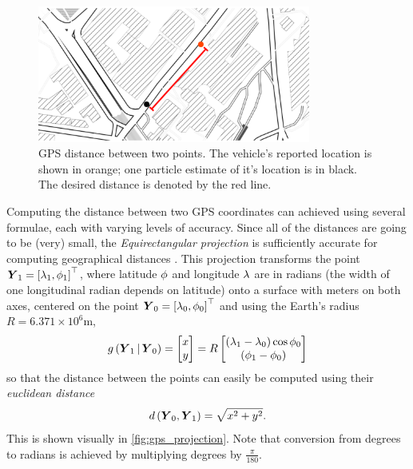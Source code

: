 \begin{knitrout}
\color{fgcolor}\begin{figure}

{\centering \includegraphics[width=0.8\textwidth]{figure/gps_dist-1} 

}

\caption[GPS distance between two points]{GPS distance between two points. The vehicle's reported location is shown in orange; one particle estimate of it's location is in black. The desired distance is denoted by the red line.}\label{fig:gps_dist}
\end{figure}


\end{knitrout}

Computing the distance between two GPS coordinates can achieved using several formulae, each with varying levels of accuracy. Since all of the distances are going to be (very) small, the \emph{Equirectangular projection} is sufficiently accurate for computing geographical distances \citep{cn}. This projection transforms the point $\boldsymbol{Y}_1 = \left[\lambda_1, \phi_1\right]^\top$, where latitude $\phi$ and longitude $\lambda$ are in radians (the width of one longitudinal radian depends on latitude) onto a surface with meters on both axes, centered on the point $\boldsymbol{Y}_0 = \left[\lambda_0, \phi_0\right]^\top$ and using the Earth's radius $R = 6.371 \times 10^6$m,
\begin{equation}
\label{eq:equirectangular_projection}
g\left(\boldsymbol{Y}_1\,|\,\boldsymbol{Y}_0\right) =
\begin{bmatrix} x \\ y \end{bmatrix} =
R \begin{bmatrix}
(\lambda_1 - \lambda_0) \cos \phi_0 \\
(\phi_1 - \phi_0)
\end{bmatrix}
\end{equation}
so that the distance between the points can easily be computed
using their \emph{euclidean distance}
\begin{equation}
\label{eq:obs_dist}
d\left(\boldsymbol{Y}_0, \boldsymbol{Y}_1\right) = \sqrt{x^2 + y^2}.
\end{equation}
This is shown visually in \cref{fig:gps_projection}.
Note that conversion from degrees to radians is achieved by
multiplying degrees by $\frac{\pi}{180}$.

